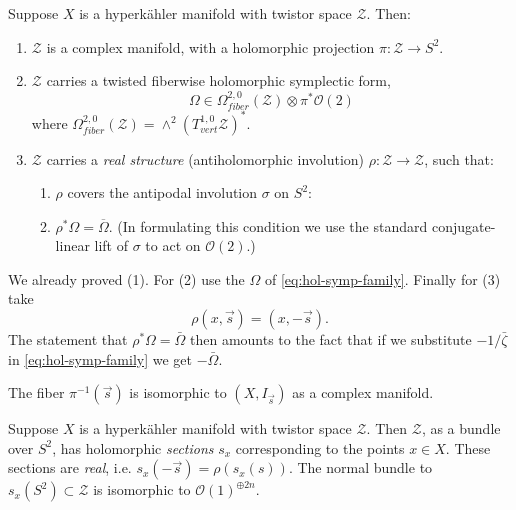 \documentclass[12pt,letterpaper,reqno]{article}
\numberwithin{equation}{section}
\newcommand{\cZ}{\ensuremath{\mathcal Z}}
\newcommand{\cO}{\ensuremath{\mathcal O}}
\newcommand{\hk}{hyperk\"ahler\xspace}
\newcommand{\ti}[1]{\textit{#1}}
\begin{document}
\begin{prop} \label{prop:twistor-space-properties}
Suppose $X$ is a \hk manifold with twistor space $\cZ$. Then:
\begin{enumerate}
\item $\cZ$ is a complex manifold, with a 
  holomorphic projection $\pi: \cZ \to S^2$.
\item $\cZ$ carries a twisted fiberwise holomorphic symplectic form,
\begin{equation}
  \Omega \in \Omega^{2,0}_{fiber}(\cZ) \otimes \pi^* \cO(2)
\end{equation}
where $\Omega^{2,0}_{fiber}(\cZ) = \wedge^2 (T^{1,0}_{vert} \cZ)^*$.
\item $\cZ$ carries a \ti{real structure} (antiholomorphic involution)
$\rho: \cZ \to \cZ$, such that:
\begin{enumerate}
\item $\rho$ covers the antipodal involution $\sigma$ on $S^2$:
\begin{center}
\end{center}
\item $\rho^* \Omega = \overline\Omega$.
(In formulating this condition we use the standard
conjugate-linear lift of $\sigma$ to act on $\cO(2)$.)
\end{enumerate}
\end{enumerate}
\end{prop}

\begin{pf}
We already proved (1). 
For (2) use the $\Omega$ of \eqref{eq:hol-symp-family}.
Finally for (3) take
\begin{equation}
  \rho(x, \vec s) = (x, - \vec s).
\end{equation}
The statement that $\rho^* \Omega = \bar\Omega$ then 
amounts to the fact that if we substitute $- 1 / \bar\zeta$
in \eqref{eq:hol-symp-family} we get $-\bar\Omega$.
\end{pf}

The fiber $\pi^{-1}(\vec s)$ is isomorphic to
$(X,I_{\vec s})$ as a complex manifold.

\begin{prop}
Suppose $X$ is a \hk manifold with twistor space $\cZ$.
Then
$\cZ$, as a bundle over $S^2$, 
has holomorphic \ti{sections} $s_x$ corresponding
to the points $x \in X$.
These sections are \ti{real}, i.e. $s_x(-\vec s) = \rho(s_x(s))$.
The normal bundle to $s_x(S^2) \subset \cZ$ is isomorphic
to $\cO(1)^{\oplus 2n}$.
\end{prop}
\end{document}
